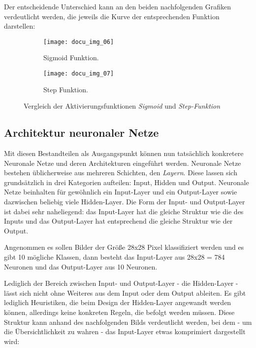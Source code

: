 Der entscheidende Unterschied kann an den beiden nachfolgenden Grafiken verdeutlicht werden, die jeweils die Kurve
der entsprechenden Funktion darstellen:

\captionsetup[subfigure]{labelformat=empty, labelsep=none}
\begin{figure}[h]
    \centering
    \begin{subfigure}{0.45\textwidth}
		\texttt{[image: docu\_img\_06]}
		\caption{\tiny{Sigmoid Funktion.}}
		\label{fig:sigmoid-function}
	\end{subfigure}
    \begin{subfigure}{0.45\textwidth}
		\texttt{[image: docu\_img\_07]}
		\caption{\tiny{Step Funktion.}}
		\label{fig:step-function}
	\end{subfigure}

    \caption{Vergleich der Aktivierungsfunktionen \textit{Sigmoid} und \textit{Step-Funktion}}
    \label{fig:activation-functions}
\end{figure}

\subsection{Architektur neuronaler Netze}

Mit diesen Bestandteilen als Ausgangspunkt können nun tatsächlich konkretere Neuronale Netze und deren Architekturen
eingeführt werden. Neuronale Netze bestehen üblicherweise aus mehreren Schichten, den \textit{Layern}. Diese lassen
sich grundsätzlich in drei Kategorien aufteilen: Input, Hidden und Output. Neuronale Netze beinhalten für gewöhnlich
ein Input-Layer und ein Output-Layer sowie dazwischen beliebig viele Hidden-Layer. Die Form der Input- und Output-Layer
ist dabei sehr naheliegend: das Input-Layer hat die gleiche Struktur wie die des Inputs und das Output-Layer hat
entsprechend die gleiche Struktur wie der Output.

Angenommen es sollen Bilder der Größe 28x28 Pixel klassifiziert werden und es gibt 10 mögliche Klassen, dann besteht das
Input-Layer aus 28x28 = 784 Neuronen und das Output-Layer aus 10 Neuronen.

Lediglich der Bereich zwischen Input- und Output-Layer - die Hidden-Layer - lässt sich nicht ohne Weiteres aus dem Input
oder dem Output ableiten. Es gibt lediglich Heuristiken, die beim Design der Hidden-Layer angewandt werden können,
allerdings keine konkreten Regeln, die befolgt werden müssen. Diese Struktur kann anhand des nachfolgenden Bilds
verdeutlicht werden, bei dem - um die Übersichtlichkeit zu wahren - das Input-Layer etwas komprimiert dargestellt wird:

